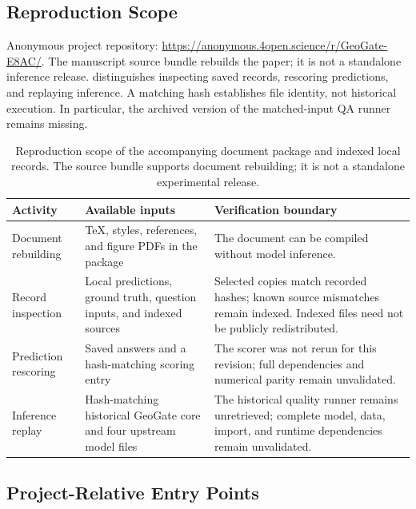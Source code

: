 \subsection{Reproduction Scope}

Anonymous project repository: \url{https://anonymous.4open.science/r/GeoGate-E8AC/}. The manuscript source bundle rebuilds the paper; it is not a standalone inference release.  distinguishes inspecting saved records, rescoring predictions, and replaying inference. A matching hash establishes file identity, not historical execution. In particular, the archived version of the matched-input QA runner remains missing.

\begin{table}[t]
\centering
\caption{Reproduction scope of the accompanying document package and indexed local records. The source bundle supports document rebuilding; it is not a standalone experimental release.}
\label{tab:supp_repro_scope}
\begin{tabular}{@{}>{\raggedright\arraybackslash}p{}>{\raggedright\arraybackslash}p{}>{\raggedright\arraybackslash}p{}@{}}
\toprule
Activity & Available inputs & Verification boundary \\
\midrule
Document rebuilding & TeX, styles, references, and figure PDFs in the package &
The document can be compiled without model inference. \\
Record inspection & Local predictions, ground truth, question inputs, and indexed sources &
Selected copies match recorded hashes; known source mismatches remain indexed.
Indexed files need not be publicly redistributed. \\
Prediction rescoring & Saved answers and a hash-matching scoring entry &
The scorer was not rerun for this revision; full dependencies and numerical parity remain unvalidated. \\
Inference replay & Hash-matching historical GeoGate core and four upstream model files &
The historical quality runner remains unretrieved; complete model, data, import, and runtime dependencies remain unvalidated. \\
\bottomrule
\end{tabular}
\end{table}

\subsection{Project-Relative Entry Points}
\label{sec:supp_repro_index}

